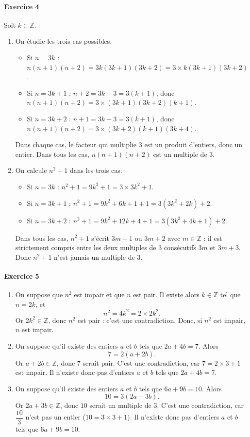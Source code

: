 \documentclass[11pt,a4paper]{article}
\newcommand{\Z}{\mathbb{Z}}
\newcommand{\exo}[1]{\paragraph{Exercice #1}}
\newcommand{\rep}[1]{\textbf{#1}}
\begin{document}
\exo{4}
Soit $k \in \Z$.
\begin{enumerate}[label=\rep{\arabic*.}]
  \item On étudie les trois cas possibles.
  \begin{itemize}
    \item Si $n = 3k$ : $n(n+1)(n+2) = 3k(3k+1)(3k+2) = 3 \times k(3k+1)(3k+2)$.
    \item Si $n = 3k + 1$ : $n + 2 = 3k + 3 = 3(k+1)$, donc $n(n+1)(n+2) = 3 \times (3k+1)(3k+2)(k+1)$.
    \item Si $n = 3k + 2$ : $n + 1 = 3k + 3 = 3(k+1)$, donc $n(n+1)(n+2) = 3 \times (3k+2)(k+1)(3k+4)$.
  \end{itemize}
  Dans chaque cas, le facteur qui multiplie $3$ est un produit d'entiers, donc un entier.
  Dans tous les cas, $n(n+1)(n+2)$ est un multiple de $3$.

  \item On calcule $n^2 + 1$ dans les trois cas.
  \begin{itemize}
    \item Si $n = 3k$ : $n^2 + 1 = 9k^2 + 1 = 3 \times 3k^2 + 1$.
    \item Si $n = 3k + 1$ : $n^2 + 1 = 9k^2 + 6k + 1 + 1 = 3(3k^2 + 2k) + 2$.
    \item Si $n = 3k + 2$ : $n^2 + 1 = 9k^2 + 12k + 4 + 1 = 3(3k^2 + 4k + 1) + 2$.
  \end{itemize}
  Dans tous les cas, $n^2 + 1$ s'écrit $3m + 1$ ou $3m + 2$ avec $m \in \Z$ : il est strictement compris entre les deux multiples de $3$ consécutifs $3m$ et $3m + 3$.
  Donc $n^2 + 1$ n'est jamais un multiple de $3$.
\end{enumerate}

\exo{5}
\begin{enumerate}[label=\rep{\arabic*.}]
  \item On suppose que $n^2$ est impair et que $n$ est pair. Il existe alors $k \in \Z$ tel que $n = 2k$, et
  \[ n^2 = 4k^2 = 2 \times 2k^2. \]
  Or $2k^2 \in \Z$, donc $n^2$ est pair : c'est une contradiction. Donc, si $n^2$ est impair, $n$ est impair.

  \item On suppose qu'il existe des entiers $a$ et $b$ tels que $2a + 4b = 7$. Alors
  \[ 7 = 2(a + 2b). \]
  Or $a + 2b \in \Z$, donc $7$ serait pair. C'est une contradiction, car $7 = 2 \times 3 + 1$ est impair.
  Il n'existe donc pas d'entiers $a$ et $b$ tels que $2a + 4b = 7$.

  \item On suppose qu'il existe des entiers $a$ et $b$ tels que $6a + 9b = 10$. Alors
  \[ 10 = 3(2a + 3b). \]
  Or $2a + 3b \in \Z$, donc $10$ serait un multiple de $3$. C'est une contradiction, car $\dfrac{10}{3}$ n'est pas un entier ($10 = 3 \times 3 + 1$).
  Il n'existe donc pas d'entiers $a$ et $b$ tels que $6a + 9b = 10$.
\end{enumerate}
\end{document}
